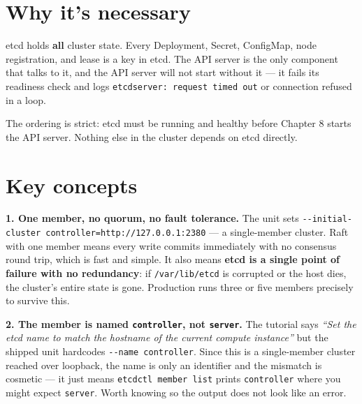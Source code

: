 \documentclass[11pt,oneside]{report}
\begin{document}
\hypertarget{why-its-necessary-7}{%
\section{Why it's
necessary}\label{why-its-necessary-7}}

\begin{whybox}

etcd holds
\textbf{all} cluster
state. Every
Deployment, Secret,
ConfigMap, node
registration, and
lease is a key in
etcd. The API server
is the only
component that talks
to it, and the API
server will not
start without it ---
it fails its
readiness check and
logs
\texttt{etcdserver:}\allowbreak{}\texttt{\ request\ timed\ out}
or connection
refused in a loop.

\end{whybox}

The ordering is
strict: etcd must be
running and healthy
before Chapter 8
starts the API
server. Nothing else
in the cluster
depends on etcd
directly.

\hypertarget{key-concepts-7}{%
\section{Key
concepts}\label{key-concepts-7}}

\textbf{1. One
member, no quorum,
no fault tolerance.}
The unit sets
\texttt{-\/-initial-}\allowbreak{}\texttt{cluster\ controller=http:}\allowbreak{}\texttt{/}\allowbreak{}\texttt{/}\allowbreak{}\texttt{127.}\allowbreak{}\texttt{0.}\allowbreak{}\texttt{0.}\allowbreak{}\texttt{1:}\allowbreak{}\texttt{2380}
--- a single-member
cluster. Raft with
one member means
every write commits
immediately with no
consensus round
trip, which is fast
and simple. It also
means \textbf{etcd
is a single point of
failure with no
redundancy}: if
\texttt{/var/lib/etcd}
is corrupted or the
host dies, the
cluster's entire
state is gone.
Production runs
three or five
members precisely to
survive this.

\textbf{2. The
member is named
\texttt{controller},
not
\texttt{server}.}
The tutorial says
\emph{``Set the etcd
name to match the
hostname of the
current compute
instance''} but the
shipped unit
hardcodes
\texttt{-\/-name\ controller}.
Since this is a
single-member
cluster reached over
loopback, the name
is only an
identifier and the
mismatch is cosmetic
--- it just means
\texttt{etcdctl\ member\ list}
prints
\texttt{controller}
where you might
expect
\texttt{server}.
Worth knowing so the
output does not look
like an error.
\end{document}
